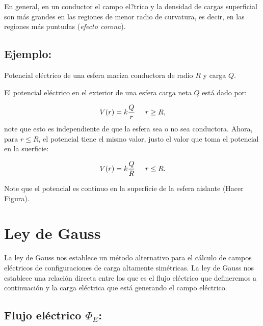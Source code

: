 En general, en un conductor el campo el?trico y la densidad de cargas superficial son más grandes en las regiones de menor radio de curvatura, es decir, en las regiones más puntudas (\textit{efecto corona}).

\subsection*{Ejemplo:} 
Potencial eléctrico de una esfera maciza conductora de radio $R$ y carga $Q$.

El potencial eléctrico en el exterior de una esfera  carga neta $Q$ está dado por:

\begin{eqnarray}
V(r)= k \dfrac{Q}{r} \hspace*{0.5 cm} r \geq R ,
\end{eqnarray}
note que esto es independiente de que la esfera sea o no sea conductora. Ahora, para $r \leq R$, el potencial tiene el mismo valor, justo el valor que toma el potencial en la suerficie:

\begin{eqnarray}
V(r) = k \dfrac{Q}{R} \hspace*{0.5 cm} r \leq R.
\end{eqnarray}

Note que el potencial es continuo en la superficie de la esfera aislante (Hacer Figura).

\section{Ley de Gauss}

La ley de Gauss nos establece un método alternativo para el cálculo de campos eléctricos de configuraciones de carga altamente simétricas. La ley de Gauss nos establece una relación directa entre los que es el flujo eléctrico que defineremos a continuación y la carga eléctrica que está generando el campo eléctrico.

\subsection*{Flujo eléctrico $\Phi_E$:}

